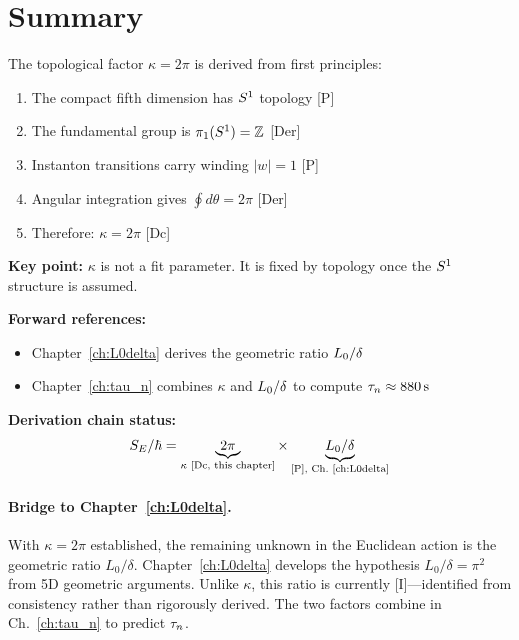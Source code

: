 \section{Summary}
\label{sec:kappa:summary}

\begin{resultbox}
    The topological factor $\kappa = 2\pi$ is derived from first principles:
    \begin{enumerate}
        \item The compact fifth dimension has $S^1$ topology [P]
        \item The fundamental group is $\pi_1(S^1) = \mathbb{Z}$ [Der]
        \item Instanton transitions carry winding $|w| = 1$ [P]
        \item Angular integration gives $\oint d\theta = 2\pi$ [Der]
        \item Therefore: $\kappa = 2\pi$ [Dc]
    \end{enumerate}

    \textbf{Key point:} $\kappa$ is not a fit parameter. It is fixed by topology
    once the $S^1$ structure is assumed.
\end{resultbox}

\bigskip
\noindent
\textbf{Forward references:}
\begin{itemize}
    \item Chapter~\ref{ch:L0delta} derives the geometric ratio $L_0/\delta$
    \item Chapter~\ref{ch:tau_n} combines $\kappa$ and $L_0/\delta$ to
          compute $\tau_n \approx 880\,\mathrm{s}$
\end{itemize}

\bigskip
\noindent
\textbf{Derivation chain status:}
\begin{equation*}
    S_E/\hbar = \underbrace{2\pi}_{\kappa \text{ [Dc, this chapter]}}
              \times \underbrace{L_0/\delta}_{\text{[P], Ch.~\ref{ch:L0delta}}}
\end{equation*}

\paragraph{Bridge to Chapter~\ref{ch:L0delta}.}
With $\kappa = 2\pi$ established, the remaining unknown in the Euclidean
action is the geometric ratio $L_0/\delta$. Chapter~\ref{ch:L0delta}
develops the hypothesis $L_0/\delta = \pi^2$ from 5D geometric arguments.
Unlike $\kappa$, this ratio is currently [I]---identified from consistency
rather than rigorously derived. The two factors combine in Ch.~\ref{ch:tau_n}
to predict $\tau_n$.

